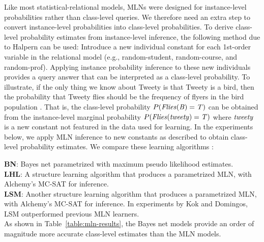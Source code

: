 \documentclass[oribibl]{llncs}
\begin{document}
Like most statistical-relational models, MLNs were designed for instance-level probabilities rather than class-level queries. We therefore need an extra step to convert instance-level probabilities into class-level probabilities. To derive class-level probability estimates from instance-level inference, the following method due to Halpern \cite[fn.3]{Halpern90} can be used: Introduce a new individual constant for each 1st-order variable in the relational model %
 (e.g., random-student, random-course, and random-prof). Applying instance probability inference to these new individuals provides a query answer that can be interpreted as a class-level probability. To illustrate, if the only thing we know about Tweety is that Tweety is a bird, then the probability that Tweety flies should be the frequency of flyers in the bird population \cite{Schulte2012c}. That is, the class-level probability $P(\it{Flies}(B) = \mathit{T})$ can be obtained from the instance-level marginal probability $P(\it{Flies}(\it{tweety}) = \mathit{T})$ where $\it{tweety}$ is a new constant not featured in the data used for learning. In the experiments below, we apply MLN inference to new constants as described to obtain class-level probability estimates.
%
We compare these learning algorithms \cite{Kok2010}:

\noindent
\textbf{BN}: Bayes net parametrized with maximum pseudo likelihood estimates.\\
\textbf{LHL}: 
A structure learning algorithm that produces a parametrized MLN, with Alchemy's MC-SAT for inference.\\
\textbf{LSM}: Another structure learning algorithm that produces a parametrized MLN, with Alchemy's MC-SAT for inference. In experiments by Kok and Domingos, LSM outperformed previous MLN learners.
\\

As shown in Table~\ref{table:mln-results}, the Bayes net models provide an order of magnitude more accurate class-level estimates than the MLN models.
\end{document}

